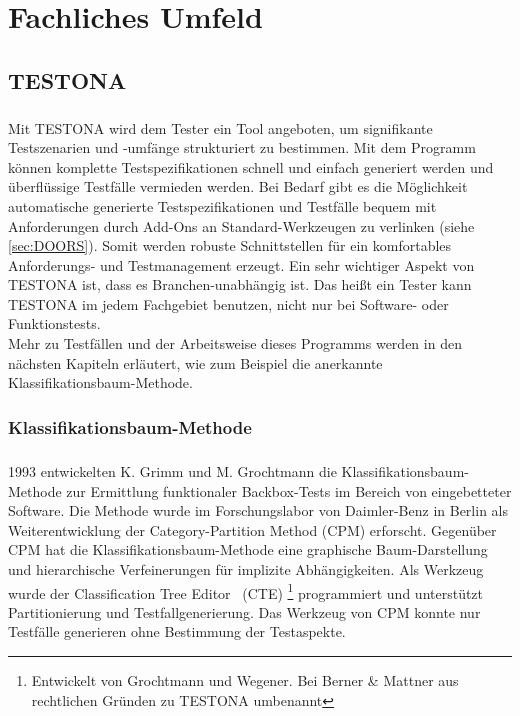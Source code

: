 \chapter{Fachliches Umfeld}\label{chp:fachlichesumfeld}

\section{TESTONA}\label{sec:Testona} 
\paragraph{}

Mit TESTONA wird dem Tester ein Tool angeboten, um signifikante Testszenarien und -umfänge strukturiert zu bestimmen. Mit dem Programm können komplette Testspezifikationen schnell und einfach generiert werden und überflüssige Testfälle vermieden werden. Bei Bedarf gibt es die Möglichkeit automatische generierte Testspezifikationen und Testfälle bequem mit Anforderungen durch Add-Ons an Standard-Werkzeugen zu verlinken (siehe \ref{sec:DOORS}). Somit werden robuste Schnittstellen für ein komfortables Anforderungs- und Testmanagement erzeugt. Ein sehr wichtiger Aspekt von TESTONA ist, dass es Branchen-unabhängig ist. Das heißt ein Tester kann TESTONA im jedem Fachgebiet benutzen, nicht nur bei Software- oder Funktionstests.\\

Mehr zu Testfällen und der Arbeitsweise dieses Programms werden in den nächsten Kapiteln erläutert, wie zum Beispiel die anerkannte Klassifikationsbaum-Methode.



\subsection{Klassifikationsbaum-Methode}\label{ssec:KM}
\paragraph{}
1993 entwickelten K. Grimm und M. Grochtmann die Klassifikationsbaum-Methode zur Ermittlung funktionaler Backbox-Tests im Bereich von eingebetteter Software. Die Methode wurde im Forschungslabor von Daimler-Benz in Berlin als Weiterentwicklung der Category-Partition Method (CPM) erforscht. Gegenüber CPM hat die Klassifikationsbaum-Methode eine graphische Baum-Darstellung und hierarchische Verfeinerungen für implizite Abhängigkeiten. Als Werkzeug wurde der \glqq Classification Tree Editor\grqq~ (CTE) \footnote{Entwickelt von Grochtmann und Wegener\cite{TestCaseDesign}. Bei Berner  \& Mattner aus rechtlichen Gründen zu TESTONA umbenannt} programmiert und unterstützt Partitionierung und Testfallgenerierung. Das Werkzeug von CPM konnte nur Testfälle generieren ohne Bestimmung der Testaspekte\cite{ClassificationTrees}.

